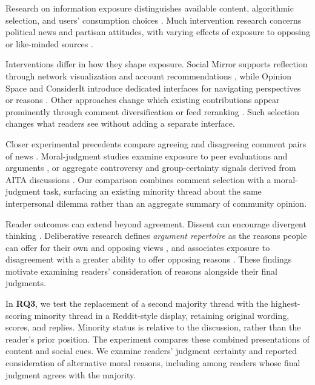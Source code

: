 Research on information exposure distinguishes available content,
algorithmic selection, and users' consumption choices
\cite{bakshy2015exposure}. Much intervention research concerns political
news and partisan attitudes, with varying effects of exposure to opposing
or like-minded sources
\cite{bail2018exposure,levy2021social,nyhan2023likeminded}.

Interventions differ in how they shape exposure. Social Mirror supports
reflection through network visualization and account recommendations
\cite{gillani2018mirror}, while Opinion Space and ConsiderIt introduce
dedicated interfaces for navigating perspectives or reasons
\cite{faridani2010opinion,kriplean2012considerit}. Other approaches change
which existing contributions appear prominently through comment
diversification \cite{northcutt2017diversification} or feed reranking
\cite{piccardi2025reranking}. Such selection changes what readers see
without adding a separate interface.

Closer experimental precedents compare agreeing and disagreeing comment
pairs of news \cite{dutceac2022cueing}.
Moral-judgment studies examine exposure to peer evaluations and arguments
\cite{kelly2017moral}, or aggregate controversy and group-certainty
signals derived from AITA discussions \cite{chen2026controversy}.
Our comparison combines comment selection with a moral-judgment task,
surfacing an existing minority thread about the same interpersonal
dilemma rather than an aggregate summary of community opinion.

Reader outcomes can extend beyond agreement. Dissent can encourage
divergent thinking \cite{nemeth1986differential}. Deliberative research
defines \emph{argument repertoire} as the reasons people can offer for
their own and opposing views \cite{cappella2002argument}, and associates
exposure to disagreement with a greater ability to offer opposing reasons
\cite{price2002disagreement}. These findings motivate examining readers'
consideration of reasons alongside their final judgments.

In \textbf{RQ3}, we test the replacement of a second majority thread with
the highest-scoring minority thread in a Reddit-style display, retaining
original wording, scores, and replies. Minority status is relative to the
discussion, rather than the reader's prior position. The experiment
compares these combined presentations of content and social cues. We
examine readers' judgment certainty and reported consideration of
alternative moral reasons, including among readers whose final judgment
agrees with the majority.
